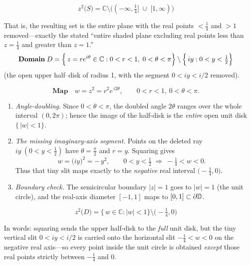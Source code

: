 \documentclass[12pt]{article}
\theoremstyle{definition} %
\theoremstyle{plain} %
\begin{document}
  \[
  \boxed{\;
        z^{2}\bigl(S\bigr)
        =\mathbb{C}\setminus\bigl((-\infty,\tfrac14]\;\cup\;[1,\infty)\bigr)
        \;}
  \]
  
  That is, the resulting set is the entire plane with the real points
  \(<\tfrac14\) and \(>1\) removed—exactly the stated “entire shaded
  plane excluding real points less than \(z=\tfrac14\) and greater than
  \(z=1\).”
  \pagebreak
\[
  \textbf{Domain}
  \;D
  =\Bigl\{\,z=re^{i\theta}\in\mathbb{C} :
         0<r<1,\;0<\theta<\pi\Bigr\}
    \setminus
    \Bigl\{\,iy:0<y<\tfrac12\Bigr\}
  \]
  (the open upper half–disk of radius 1, with the segment
  \(0<iy<i/2\) removed).
  
  \[
  \textbf{Map}\quad
  w=z^{2}=r^{2}e^{\,i2\theta},
  \qquad 0<r<1,\ 0<\theta<\pi .
  \]
  
  \begin{enumerate}
    \item \emph{Angle-doubling.}  
          Since \(0<\theta<\pi\), the doubled angle \(2\theta\) ranges over
          the whole interval \((0,2\pi)\);
          hence the image of the half-disk is the \emph{entire} open unit
          disk \(\{\,|w|<1\}\).
  
    \item \emph{The missing imaginary-axis segment.}  
          Points on the deleted ray \(iy\;(0<y<\tfrac12)\) have
          \(\theta=\tfrac{\pi}{2}\) and \(r=y\).
          Squaring gives  
          \[
              w
              =\bigl(iy\bigr)^{2}
              =-\,y^{2},
              \qquad 0<y<\tfrac12
              \;\Longrightarrow\;
              -\tfrac14<w<0 .
          \]
          Thus that tiny slit maps exactly to the \emph{negative} real
          interval \(\bigl(-\tfrac14,0\bigr)\).
  
    \item \emph{Boundary check.}  
          The semicircular boundary \(|z|=1\) goes to \(|w|=1\) (the unit
          circle), and the real-axis diameter \([-1,1]\) maps to
          \([0,1]\subset\partial\Bbb D\).
  \end{enumerate}
  
  \[
  \boxed{\;
        z^{2}\bigl(D\bigr)
        =\{\,w\in\mathbb{C}:|w|<1\}\setminus\bigl(-\tfrac14,0\bigr)
        \;}
  \]
  
  \medskip
  In words: squaring sends the upper half-disk to the \emph{full} unit
  disk, but the tiny vertical slit \(0<iy<i/2\) is carried onto the
  horizontal slit \(-\tfrac14<w<0\) on the negative real axis—so every
  point inside the unit circle is obtained \emph{except} those real points
  strictly between \(-\tfrac14\) and \(0\).
  \pagebreak
\end{document}
